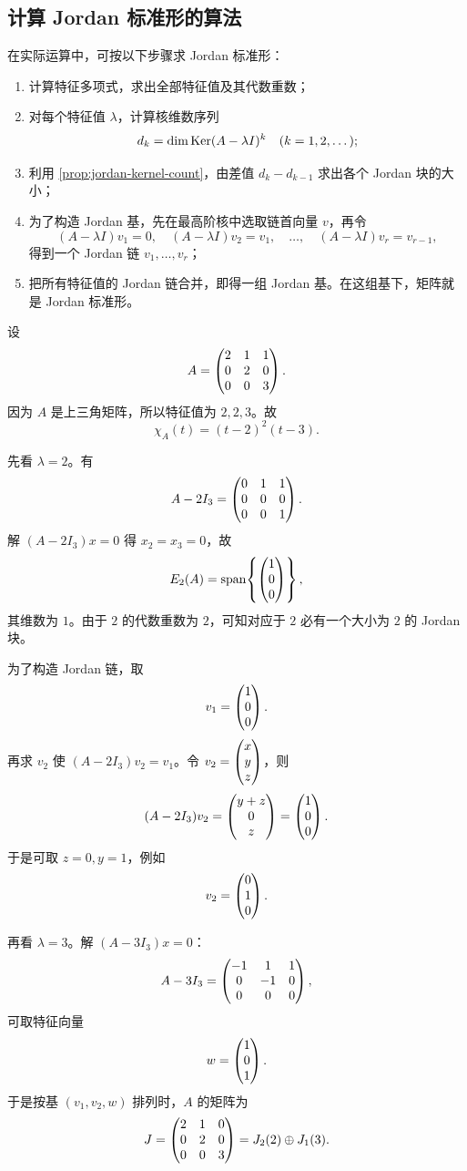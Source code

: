 \subsection{计算 Jordan 标准形的算法}

在实际运算中，可按以下步骤求 Jordan 标准形：

\begin{enumerate}[label=\arabic*., leftmargin=2.4em]
  \item 计算特征多项式，求出全部特征值及其代数重数；
  \item 对每个特征值 \(\lambda\)，计算核维数序列
  \[
  d_k=\dim \mathrm{Ker}(A-\lambda I)^k \quad (k=1,2,\dots);
  \]
  \item 利用 \cref{prop:jordan-kernel-count}，由差值 \(d_k-d_{k-1}\) 求出各个 Jordan 块的大小；
  \item 为了构造 Jordan 基，先在最高阶核中选取链首向量 \(v\)，再令
  \[
  (A-\lambda I)v_1=0,\quad (A-\lambda I)v_2=v_1,\quad \dots,\quad (A-\lambda I)v_r=v_{r-1},
  \]
  得到一个 Jordan 链 \(v_1,\dots,v_r\)；
  \item 把所有特征值的 Jordan 链合并，即得一组 Jordan 基。在这组基下，矩阵就是 Jordan 标准形。
\end{enumerate}

\begin{example}[一个 \(3\times 3\) 例子]\label{ex:jordan-3x3}
设
\[
A=\begin{pmatrix} 2&1&1\\0&2&0\\0&0&3 \end{pmatrix}.
\]
因为 \(A\) 是上三角矩阵，所以特征值为 \(2,2,3\)。故
\[
\chi_A(t)=(t-2)^2(t-3).
\]

先看 \(\lambda=2\)。有
\[
A-2I_3=\begin{pmatrix} 0&1&1\\0&0&0\\0&0&1 \end{pmatrix}.
\]
解 \((A-2I_3)x=0\) 得 \(x_2=x_3=0\)，故
\[
E_2(A)=\operatorname{span}\!\left\{\begin{pmatrix} 1\\0\\0 \end{pmatrix}\right\},
\]
其维数为 \(1\)。由于 \(2\) 的代数重数为 \(2\)，可知对应于 \(2\) 必有一个大小为 \(2\) 的 Jordan 块。

为了构造 Jordan 链，取
\[
v_1=\begin{pmatrix} 1\\0\\0 \end{pmatrix}.
\]
再求 \(v_2\) 使 \((A-2I_3)v_2=v_1\)。令 \(v_2=\begin{pmatrix} x\\y\\z \end{pmatrix}\)，则
\[
(A-2I_3)v_2=\begin{pmatrix} y+z\\0\\z \end{pmatrix}=\begin{pmatrix} 1\\0\\0 \end{pmatrix}.
\]
于是可取 \(z=0,y=1\)，例如
\[
v_2=\begin{pmatrix} 0\\1\\0 \end{pmatrix}.
\]

再看 \(\lambda=3\)。解 \((A-3I_3)x=0\)：
\[
A-3I_3=\begin{pmatrix} -1&1&1\\0&-1&0\\0&0&0 \end{pmatrix},
\]
可取特征向量
\[
w=\begin{pmatrix} 1\\0\\1 \end{pmatrix}.
\]
于是按基 \((v_1,v_2,w)\) 排列时，\(A\) 的矩阵为
\[
J=\begin{pmatrix} 2&1&0\\0&2&0\\0&0&3 \end{pmatrix}=J_2(2)\oplus J_1(3).
\]
\end{example}

